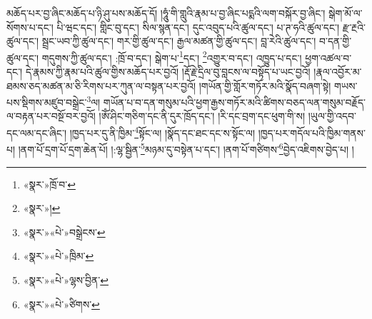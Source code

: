 མཆོད་པར་བྱ་ཞིང་མཆོད་པ་ཉི་ཤུ་པས་མཆོད་དོ། །ཧཱུཾ་གི་གླུའི་རྣམ་པ་བྱ་ཞིང་པདྨའི་ལག་བསྐོར་བྱ་ཞིང་། སྒེག་མོ་ལ་སོགས་པ་དང་། པི་ཝང་དང་། གླིང་བུ་དང་། སིལ་སྙན་དང་། དུང་འབུད་པའི་ཚུལ་དང་། པ་ཊ་ཧའི་ཚུལ་དང་། རྫ་རྔའི་ཚུལ་དང་། སྦྲང་ཡབ་ཀྱི་ཚུལ་དང་། གར་གྱི་ཚུལ་དང་། རྒྱལ་མཚན་གྱི་ཚུལ་དང་། བླ་རེའི་ཚུལ་དང་། བ་དན་གྱི་ཚུལ་དང་། གདུགས་ཀྱི་ཚུལ་དང་། :ཁྲོ་བ་དང་། སྒེག་པ་\footnote{«སྣར་»ཁྲོ་བ་}དང་། \footnote{«སྣར་»།  }འགྱུར་བ་དང་། འཁྱུད་པ་དང་། ཕྱག་འཚལ་བ་དང་། དེ་རྣམས་ཀྱི་རྣམ་པའི་ཚུལ་གྱིས་མཆོད་པར་བྱའོ། །རྡོ་རྗེ་དྲིལ་བུ་བླངས་ལ་བསྟོད་པ་ཡང་བྱའོ། །རྣལ་འབྱོར་མ་ཐམས་ཅད་མཚན་མ་ཅི་རིགས་པར་ཀུན་ལ་བསྟན་པར་བྱའོ། །གཡོན་གྱི་གློར་གཏོར་མའི་སྣོད་བཞག་སྟེ། གཡས་པས་སྡིགས་མཛུབ་བསྒྲེང་\footnote{«སྣར་»«པེ་»བསྒྲེངས་}ལ། གཡོན་པ་བ་དན་གསུམ་པའི་ཕྱག་རྒྱས་གཏོར་མའི་ཚིགས་བཅད་ལན་གསུམ་བརྗོད་ལ་བརྟན་པར་བསྔོ་བར་བྱའོ། །ཨོཾ་ཤིང་གཅིག་དང་ནི་དུར་ཁྲོད་དང་། །རི་དང་བྲག་དང་ཕུག་གི་ས། །ཡུལ་གྱི་འདབ་དང་ལམ་དང་ཞིང་། །ཁྱད་པར་དུ་ནི་ཁྱིམ་\footnote{«སྣར་»«པེ་»ཁྲིམ་}སྟོང་ལ། །སྣོད་དང་ཐང་དང་ས་སྟོང་ལ། །ཁྱད་པར་གདོལ་པའི་ཁྱིམ་གནས་པ། །ནག་པོ་དྲག་པོ་དྲག་ཆེན་པོ། །:ལྷ་སྦྱིན་\footnote{«སྣར་»«པེ་»ལྷས་བྱིན་}མཉམ་དུ་བསྟེན་པ་དང་། །ནག་པོ་གཙིགས་\footnote{«སྣར་»«པེ་»ཙིགས་}བྱེད་འཇིགས་བྱེད་པ། །
